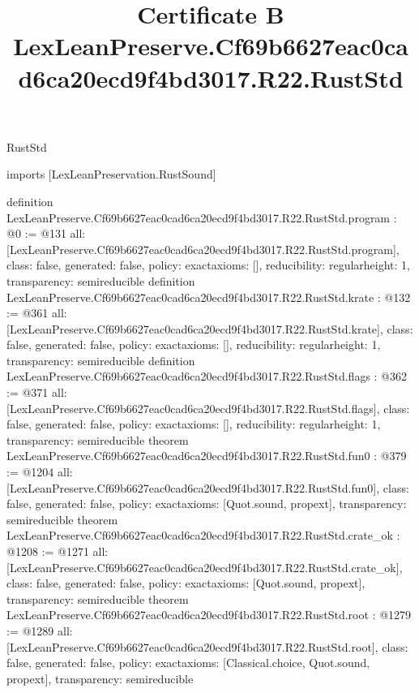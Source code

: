 \begin{lexlean}{RustStd}
\title{Certificate B LexLeanPreserve.Cf69b6627eac0cad6ca20ecd9f4bd3017.R22.RustStd}
\begin{coremodule}
imports [LexLeanPreservation.RustSound]

definition LexLeanPreserve.Cf69b6627eac0cad6ca20ecd9f4bd3017.R22.RustStd.program : @0 := @131 {
  all: [LexLeanPreserve.Cf69b6627eac0cad6ca20ecd9f4bd3017.R22.RustStd.program],
  class: false,
  generated: false,
  policy: exact{axioms: []},
  reducibility: regular{height: 1},
  transparency: semireducible
}
definition LexLeanPreserve.Cf69b6627eac0cad6ca20ecd9f4bd3017.R22.RustStd.krate : @132 := @361 {
  all: [LexLeanPreserve.Cf69b6627eac0cad6ca20ecd9f4bd3017.R22.RustStd.krate],
  class: false,
  generated: false,
  policy: exact{axioms: []},
  reducibility: regular{height: 1},
  transparency: semireducible
}
definition LexLeanPreserve.Cf69b6627eac0cad6ca20ecd9f4bd3017.R22.RustStd.flags : @362 := @371 {
  all: [LexLeanPreserve.Cf69b6627eac0cad6ca20ecd9f4bd3017.R22.RustStd.flags],
  class: false,
  generated: false,
  policy: exact{axioms: []},
  reducibility: regular{height: 1},
  transparency: semireducible
}
theorem LexLeanPreserve.Cf69b6627eac0cad6ca20ecd9f4bd3017.R22.RustStd.fun0 : @379 := @1204 {
  all: [LexLeanPreserve.Cf69b6627eac0cad6ca20ecd9f4bd3017.R22.RustStd.fun0],
  class: false,
  generated: false,
  policy: exact{axioms: [Quot.sound, propext]},
  transparency: semireducible
}
theorem LexLeanPreserve.Cf69b6627eac0cad6ca20ecd9f4bd3017.R22.RustStd.crate_ok : @1208 := @1271 {
  all: [LexLeanPreserve.Cf69b6627eac0cad6ca20ecd9f4bd3017.R22.RustStd.crate_ok],
  class: false,
  generated: false,
  policy: exact{axioms: [Quot.sound, propext]},
  transparency: semireducible
}
theorem LexLeanPreserve.Cf69b6627eac0cad6ca20ecd9f4bd3017.R22.RustStd.root : @1279 := @1289 {
  all: [LexLeanPreserve.Cf69b6627eac0cad6ca20ecd9f4bd3017.R22.RustStd.root],
  class: false,
  generated: false,
  policy: exact{axioms: [Classical.choice, Quot.sound, propext]},
  transparency: semireducible
}


\end{coremodule}
\end{lexlean}
